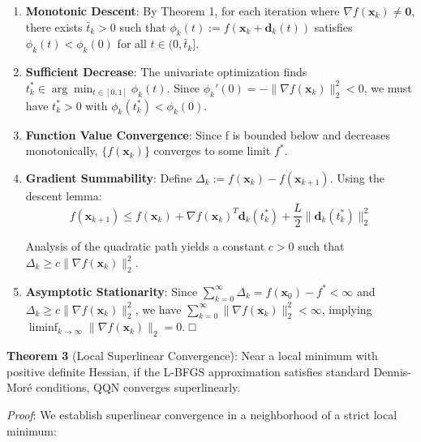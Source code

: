 \begin{enumerate}
\def\labelenumi{\arabic{enumi}.}
\item
  \textbf{Monotonic Descent}: By Theorem 1, for each iteration where \(\nabla f(\mathbf{x}_k) \neq \mathbf{0}\), there exists \(\bar{t}_k > 0\) such that \(\phi_k(t) := f(\mathbf{x}_k + \mathbf{d}_k(t))\) satisfies \(\phi_k(t) < \phi_k(0)\) for all \(t \in (0, \bar{t}_k]\).
\item
  \textbf{Sufficient Decrease}: The univariate optimization finds \(t_k^* \in \arg\min_{t \in [0,1]} \phi_k(t)\).
  Since \(\phi_k'(0) = -\|\nabla f(\mathbf{x}_k)\|_2^2 < 0\), we must have \(t_k^* > 0\) with \(\phi_k(t_k^*) < \phi_k(0)\).
\item
  \textbf{Function Value Convergence}: Since f is bounded below and decreases monotonically, \(\{f(\mathbf{x}_k)\}\) converges to some limit \(f^*\).
\item
  \textbf{Gradient Summability}: Define \(\Delta_k := f(\mathbf{x}_k) - f(\mathbf{x}_{k+1})\). Using the descent lemma:
  \[f(\mathbf{x}_{k+1}) \leq f(\mathbf{x}_k) + \nabla f(\mathbf{x}_k)^T \mathbf{d}_k(t_k^*) + \frac{L}{2}\|\mathbf{d}_k(t_k^*)\|_2^2\]

  Analysis of the quadratic path yields a constant \(c > 0\) such that \(\Delta_k \geq c\|\nabla f(\mathbf{x}_k)\|_2^2\).
\item
  \textbf{Asymptotic Stationarity}: Since \(\sum_{k=0}^{\infty} \Delta_k = f(\mathbf{x}_0) - f^* < \infty\) and
  \(\Delta_k \geq c\|\nabla f(\mathbf{x}_k)\|_2^2\), we have \(\sum_{k=0}^{\infty} \|\nabla f(\mathbf{x}_k)\|_2^2 < \infty\),
  implying \(\liminf_{k \to \infty} \|\nabla f(\mathbf{x}_k)\|_2 = 0\). □
\end{enumerate}

\textbf{Theorem 3} (Local Superlinear Convergence): Near a local minimum with positive definite Hessian, if the L-BFGS approximation satisfies standard Dennis-Moré conditions, QQN converges superlinearly.

\emph{Proof}: We establish superlinear convergence in a neighborhood of a strict local minimum:

